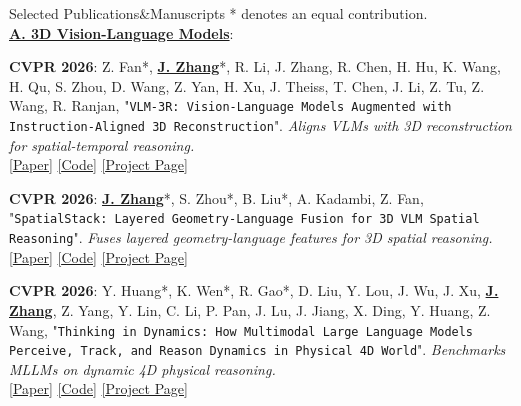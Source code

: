 \documentclass{resume} %
\begin{document}
\vspace{-1mm}

\begin{rSection}{Selected Publications\&Manuscripts}
\sloppy
\vspace{-1mm}
\small{* denotes an equal contribution.} \\
\textbf{\underline{A. 3D Vision-Language Models}}:

{\bf CVPR 2026}: Z. Fan*, \underline{\textbf{J. Zhang}}*, R. Li, J. Zhang, R. Chen, H. Hu, K. Wang, H. Qu, S. Zhou, D. Wang, Z. Yan, H. Xu, J. Theiss, T. Chen, J. Li, Z. Tu, Z. Wang, R. Ranjan,
"{\texttt{VLM-3R: Vision-Language Models Augmented with Instruction-Aligned 3D Reconstruction}}". {\footnotesize\emph{Aligns VLMs with 3D reconstruction for spatial-temporal reasoning.}}\\
\hspace{1em}
{\color{BlueViolet}
\href{https://arxiv.org/abs/2505.20279}{[\underline{Paper}]}\hspace{1em}
\href{https://github.com/VITA-Group/VLM-3R}{[\underline{Code}]}\hspace{1em}
\href{https://vlm-3r.github.io/}{[\underline{Project Page}]}}
\vspace{-1mm}

{\bf CVPR 2026}: \underline{\textbf{J. Zhang}}*, S. Zhou*, B. Liu*, A. Kadambi, Z. Fan,
"{\texttt{SpatialStack: Layered Geometry-Language Fusion for 3D VLM Spatial Reasoning}}". {\footnotesize\emph{Fuses layered geometry-language features for 3D spatial reasoning.}}\\
\hspace{1em} {\color{BlueViolet} \href{https://arxiv.org/abs/2603.27437}{[\underline{Paper}]}\hspace{1em} \href{https://github.com/jzh15/SpatialStack}{[\underline{Code}]}\hspace{1em} \href{https://spatial-stack.github.io/}{[\underline{Project Page}]}} \vspace{-1mm}

{\bf CVPR 2026}: Y. Huang*, K. Wen*, R. Gao*, D. Liu, Y. Lou, J. Wu, J. Xu, \underline{\textbf{J. Zhang}}, Z. Yang, Y. Lin, C. Li, P. Pan, J. Lu, J. Jiang, X. Ding, Y. Huang, Z. Wang,
"{\texttt{Thinking in Dynamics: How Multimodal Large Language Models Perceive, Track, and Reason Dynamics in Physical 4D World}}". {\footnotesize\emph{Benchmarks MLLMs on dynamic 4D physical reasoning.}}\\
\hspace{1em} {\color{BlueViolet} \href{https://arxiv.org/abs/2603.12746}{[\underline{Paper}]}\hspace{1em} \href{https://github.com/Dynamics-X/Thinking-in-Dynamics}{[\underline{Code}]}\hspace{1em} \href{https://dyn-bench.github.io/}{[\underline{Project Page}]}} \vspace{-1mm}


\end{rSection}
\end{document}
